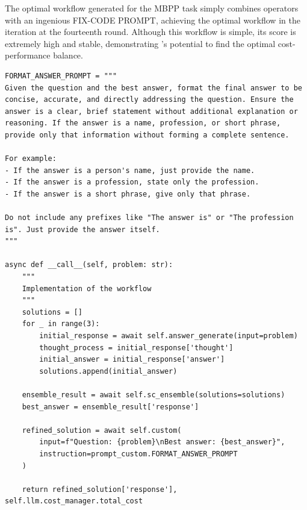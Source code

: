 The optimal workflow generated for the MBPP task simply combines operators with an ingenious FIX-CODE PROMPT, achieving the optimal workflow in the iteration at the fourteenth round. Although this workflow is simple, its score is extremely high and stable, demonstrating \model's potential to find the optimal cost-performance balance.

\begin{tcolorbox}[title={\textbf{\small The optimal workflow generated for HotpotQA}}, boxrule=1pt, arc=0mm, colback=black!5!white, colframe=black!75!white, breakable, before skip=10pt, after skip=10pt, pad at break=2mm, parbox=false] \begin{verbatim}
FORMAT_ANSWER_PROMPT = """
Given the question and the best answer, format the final answer to be concise, accurate, and directly addressing the question. Ensure the answer is a clear, brief statement without additional explanation or reasoning. If the answer is a name, profession, or short phrase, provide only that information without forming a complete sentence.

For example:
- If the answer is a person's name, just provide the name.
- If the answer is a profession, state only the profession.
- If the answer is a short phrase, give only that phrase.

Do not include any prefixes like "The answer is" or "The profession is". Just provide the answer itself.
"""

async def __call__(self, problem: str):
    """
    Implementation of the workflow
    """
    solutions = []
    for _ in range(3):
        initial_response = await self.answer_generate(input=problem)
        thought_process = initial_response['thought']
        initial_answer = initial_response['answer']
        solutions.append(initial_answer)

    ensemble_result = await self.sc_ensemble(solutions=solutions)
    best_answer = ensemble_result['response']

    refined_solution = await self.custom(
        input=f"Question: {problem}\nBest answer: {best_answer}",
        instruction=prompt_custom.FORMAT_ANSWER_PROMPT
    )

    return refined_solution['response'], self.llm.cost_manager.total_cost
\end{verbatim}
\end{tcolorbox}


